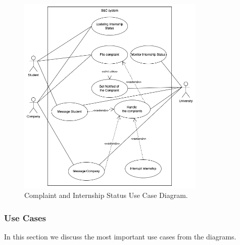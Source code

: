 \begin{figure}[H]
\centering
\includegraphics[width=0.8\textwidth]{Images/Complaint_handling_Use_Case_Diagram.png}
\caption{\label{fig:metamodel9}Complaint and Internship Status Use Case Diagram.}
\end{figure}

\subsubsection{Use Cases}

In this section we discuss the most important use cases from the diagrams.

